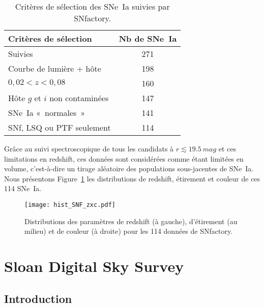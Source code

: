\documentclass[../main/main.tex]{subfiles}
\begin{document}
\begin{table}[ht]
    \centering
    \caption{Critères de sélection des SNe~Ia suivies par SNfactory.}
    \label{tab:snfcuts}
    \begin{tabular}{lc}
        \toprule
        Critères de sélection           & Nb de SNe~Ia \\
        \midrule
        Suivies                         & 271 \\
        Courbe de lumière + hôte        & 198 \\
        $0,02 < z < 0,08$               & 160 \\
        Hôte $g$ et $i$ non contaminées & 147 \\
        SNe~Ia «~normales~»             & 141 \\
        SNf, LSQ ou PTF seulement       & 114 \\
        \bottomrule
    \end{tabular}
\end{table}

Grâce au suivi spectroscopique de tous les candidats à $r \lesssim
\SI{19,5}{mag}$ et ces limitations en redshift, ces données sont considérées
comme étant limitées en volume, c'est-à-dire un tirage aléatoire des populations
sous-jacentes de SNe~Ia. Nous présentons Figure~\ref{fig:snfhist} les
distributions de redshift, étirement et couleur de ces 114 SNe~Ia.

\begin{figure}[ht]
    \centering
    \texttt{[image: hist\_SNF\_zxc.pdf]}
    \caption[Distributions des paramètres de redshift, étirement et couleur de
    SNf]{Distributions des paramètres de redshift (à gauche), d'étirement (au
    milieu) et de couleur (à droite) pour les 114 données de SNfactory.}
    \label{fig:snfhist}
\end{figure}

\section{Sloan Digital Sky Survey}\label{sec:sdss}
\subsection{Introduction}\label{ssec:sdssintro}
\end{document}
